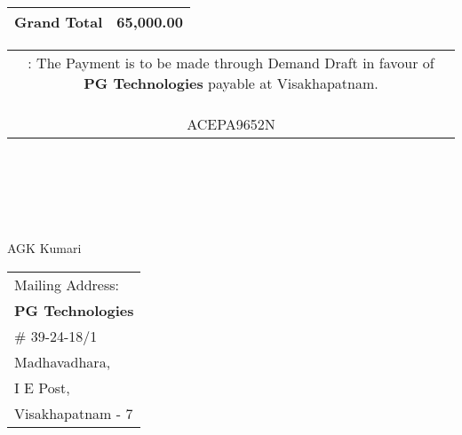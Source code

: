 \documentclass[11pt]{article}
\begin{document}
\vspace*{0.45cm}

\hspace*{12.3cm}
\begin{tabular}{|c|r|}
\hline
{\bf Grand Total} & 65,000.00 \\
\hline
\end{tabular}

\vspace*{-0.45cm}
\hspace*{-0.65cm}
\begin{tabular}{c}
\parbox{4in}{ : The Payment is to be made through Demand Draft in favour of {\bf PG Technologies} payable at Visakhapatnam. \\ \\
 ACEPA9652N}\\
\end{tabular}
\vspace*{75pt}


 \\ \\ \\ \\ \\
 \hspace*{0.2cm}AGK Kumari
\vspace*{-71pt}
\begin{flushright}
\begin{tabular}{l}
Mailing Address:\\
{\bf PG Technologies}\\
\# 39-24-18/1\\
Madhavadhara, \\ 
I E Post, \\
Visakhapatnam - 7\\
\end{tabular}
\end{flushright}
\end{document}
